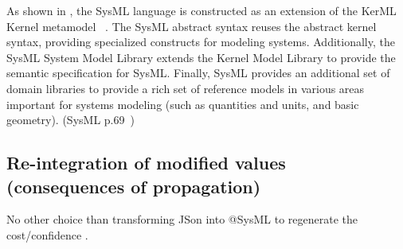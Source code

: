 As shown in , the SysML language is constructed as an extension of the KerML Kernel metamodel ~\cite{kerML}. The SysML abstract syntax reuses the abstract kernel syntax, providing specialized constructs for modeling systems. Additionally, the SysML System Model Library extends the Kernel Model Library to provide the semantic specification for SysML. Finally, SysML provides an additional set of domain libraries to provide a rich set of reference models in various areas important for systems modeling (such as quantities and units, and basic geometry). (SysML p.69~\cite{sysml}) 


\subsection{Re-integration of modified values (consequences of propagation)}
No other choice than transforming JSon into @SysML to regenerate the cost/confidence .

